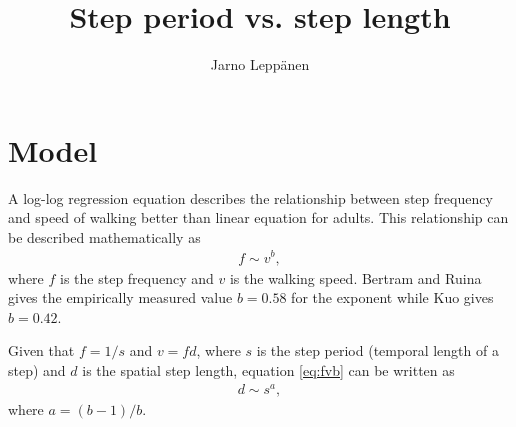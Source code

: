 \documentclass[a4paper,parskip=half]{scrartcl}
\author{Jarno Leppänen}
\title{Step period vs. step length}
\begin{document}
\maketitle

\section{Model}

A log-log regression equation describes the relationship between step frequency
and speed of walking better than linear equation for
adults.\cite{grieve1966relationships} This relationship can be described
mathematically as
\begin{align} \label{eq:fvb}
f \sim v^b,
\end{align}
where $f$ is the step frequency and $v$ is the walking speed. Bertram and Ruina
gives the empirically measured value $b = 0.58$ for the exponent while Kuo gives
$b = 0.42$.\cite{bertram2001multiple,kuo2001simple}

Given that $f = 1/s$ and $v = fd$, where $s$ is the step period (temporal length of a step)
and $d$ is the spatial step length, equation \ref{eq:fvb} can be written as
\begin{align} \label{eq:dsa}
d \sim s^a,
\end{align}
where $a = (b - 1)/b$.



\end{document}
